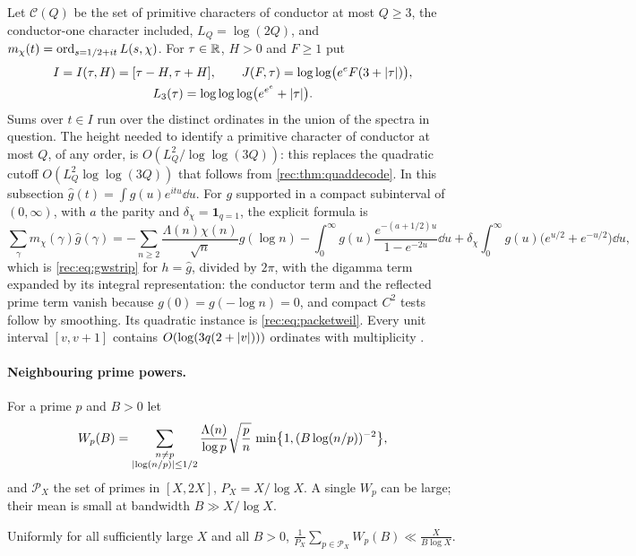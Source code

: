 Let $\mathcal C(Q)$ be the set of primitive characters of conductor at most $Q\ge3$, the
conductor-one character included, $L_Q=\log(2Q)$, and $m_\chi(t)=\operatorname{ord}_{s=1/2+it}L(s,\chi)$. For
$\tau\in\mathbb{R}$, $H>0$ and $F\ge1$ put
\begin{gather*}
 I=I(\tau,H)=[\tau-H,\tau+H],\qquad J(F,\tau)=\log\log\bigl(e^eF(3+\lvert\tau\rvert)\bigr),\\
 L_3(\tau)=\log\log\log\bigl(e^{e^e}+\lvert\tau\rvert\bigr).
\end{gather*}
Sums over $t\in I$ run over the distinct ordinates in the union of the spectra in question. The
height needed to identify a primitive character of conductor at most $Q$, of any order, is
$O(L_Q^2/\log\log(3Q))$: this replaces the quadratic cutoff $O(L_Q^2\log\log(3Q))$ that follows from
\cref{rec:thm:quaddecode}. In this subsection $\widehat g(t)=\int g(u)e^{itu}\dd u$. For $g$ supported in a compact
subinterval of $(0,\infty)$, with $a$ the parity and $\delta_\chi=\mathbf 1_{q=1}$, the explicit formula is
\begin{equation}\label{rec:eq:halfweil}
 \sum_\gamma m_\chi(\gamma)\widehat g(\gamma)=-\sum_{n\ge2}\frac{\Lambda(n)\chi(n)}{\sqrt n}g(\log n)
 -\int_0^\infty g(u)\frac{e^{-(a+1/2)u}}{1-e^{-2u}}\dd u+\delta_\chi\int_0^\infty g(u)\bigl(e^{u/2}+e^{-u/2}\bigr)\dd u,
\end{equation}
which is \eqref{rec:eq:gwstrip} for $h=\widehat g$, divided by $2\pi$, with the digamma term expanded by its
integral representation: the conductor term and the reflected prime term vanish because
$g(0)=g(-\log n)=0$, and compact $C^2$ tests follow by smoothing. Its quadratic instance is
\eqref{rec:eq:packetweil}. Every unit interval
$[v,v+1]$ contains $O(\log(3q(2+\lvert v\rvert)))$ ordinates with multiplicity
\cite{BennettMartinOBryantRechnitzer2021Counting}.

\paragraph{Neighbouring prime powers.}
For a prime $p$ and $B>0$ let
\[
 W_p(B)=\sum_{\substack{n\ne p\\ \lvert\log(n/p)\rvert\le1/2}}\frac{\Lambda(n)}{\log p}\sqrt{\frac pn}\,\min\bigl\{1,(B\log(n/p))^{-2}\bigr\},
\]
and $\mathcal P_X$ the set of primes in $[X,2X]$, $P_X=X/\log X$. A single $W_p$ can be large; their mean is
small at bandwidth $B\gg X/\log X$.

\begin{lemma}\label{rec:lem:neighbours}
Uniformly for all sufficiently large $X$ and all $B>0$,
$\frac1{P_X}\sum_{p\in\mathcal P_X}W_p(B)\ll\frac X{B\log X}$.
\end{lemma}

